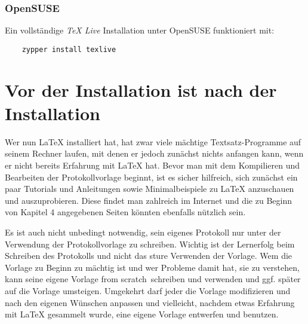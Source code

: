 \subsubsection{OpenSUSE}
Ein vollständige \textit{TeX Live} Installation unter OpenSUSE funktioniert mit:
\begin{verbatim}
	zypper install texlive
\end{verbatim}

\section{Vor der Installation ist nach der Installation}
Wer nun LaTeX installiert hat, hat zwar viele mächtige Textsatz-Programme auf seinem Rechner laufen, mit denen er jedoch zunächst nichts anfangen kann, wenn er nicht bereits Erfahrung mit LaTeX hat. Bevor man mit dem Kompilieren und Bearbeiten der Protokollvorlage beginnt, ist es sicher hilfreich, sich zunächst ein paar Tutorials und Anleitungen sowie Minimalbeispiele zu LaTeX anzuschauen und auszuprobieren. Diese findet man zahlreich im Internet und die zu Beginn von Kapitel 4 angegebenen Seiten könnten ebenfalls nützlich sein.

Es ist auch nicht unbedingt notwendig, sein eigenes Protokoll nur unter der Verwendung der Protokollvorlage zu schreiben. Wichtig ist der Lernerfolg beim Schreiben des Protokolls und nicht das sture Verwenden der Vorlage. Wem die Vorlage zu Beginn zu mächtig ist und wer Probleme damit hat, sie zu verstehen, kann seine eigene Vorlage \glqq from scratch\grqq\ schreiben und verwenden und ggf. später auf die Vorlage umsteigen. Umgekehrt darf jeder die Vorlage modifizieren und nach den eigenen Wünschen anpassen und vielleicht, nachdem etwas Erfahrung mit LaTeX gesammelt wurde, eine eigene Vorlage entwerfen und benutzen.